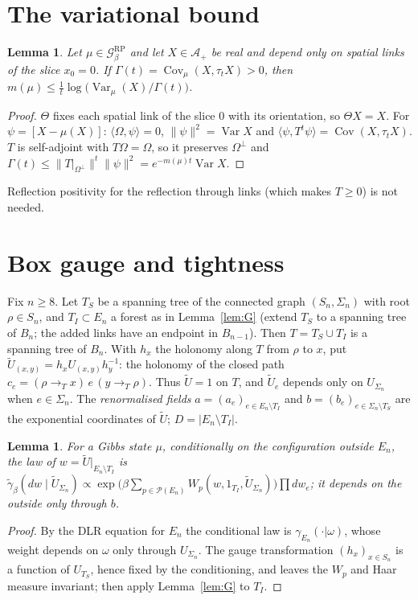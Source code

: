 \documentclass[11pt,a4paper]{article}
\theoremstyle{plain}
\newtheorem{lemma}[theorem]{Lemma}
\theoremstyle{definition}
\theoremstyle{remark}
\numberwithin{equation}{section}
\newcommand{\Var}{\operatorname{Var}}
\newcommand{\Cov}{\operatorname{Cov}}
\newcommand{\cP}{\mathcal{P}}
\newcommand{\cG}{\mathcal{G}}
\newcommand{\Th}{\Theta}
\newcommand{\Tg}{\widetilde U}
\begin{document}
\section{The variational bound}\label{sec:V}

\begin{lemma}\label{lem:V}
Let $\mu\in\cG^{\mathrm{RP}}_\beta$ and let $X\in\mathcal A_+$ be real and depend only on spatial links of the slice $x_0=0$. If
$\Gamma(t)=\Cov_\mu(X,\tau_tX)>0$, then $m(\mu)\le\frac1t\log\bigl(\Var_\mu(X)/\Gamma(t)\bigr)$.
\end{lemma}
\begin{proof}
$\Th$ fixes each spatial link of the slice $0$ with its orientation, so $\Th X=X$. For $\psi=[X-\mu(X)]$: $\langle\Omega,\psi\rangle=0$,
$\|\psi\|^2=\Var X$ and $\langle\psi,T^t\psi\rangle=\Cov(X,\tau_tX)$. $T$ is self-adjoint with $T\Omega=\Omega$, so it preserves
$\Omega^\perp$ and $\Gamma(t)\le\|T|_{\Omega^\perp}\|^t\|\psi\|^2=e^{-m(\mu)t}\Var X$.
\end{proof}
Reflection positivity for the reflection through links (which makes $T\ge0$) is not needed.

\section{Box gauge and tightness}\label{sec:box}

Fix $n\ge8$. Let $T_S$ be a spanning tree of the connected graph $(S_n,\Sigma_n)$ with root $\rho\in S_n$, and $T_I\subset E_n$ a forest as
in Lemma~\ref{lem:G} (extend $T_S$ to a spanning tree of $B_n$; the added links have an endpoint in $B_{n-1}$). Then $T=T_S\cup T_I$ is a
spanning tree of $B_n$. With $h_x$ the holonomy along $T$ from $\rho$ to $x$, put $\Tg_{(x,y)}=h_xU_{(x,y)}h_y^{-1}$: the holonomy of the
closed path $c_e=(\rho\to_Tx)\,e\,(y\to_T\rho)$. Thus $\Tg=1$ on $T$, and $\Tg_e$ depends only on $U_{\Sigma_n}$ when $e\in\Sigma_n$. The
\emph{renormalised fields} $a=(a_e)_{e\in E_n\setminus T_I}$ and $b=(b_e)_{e\in\Sigma_n\setminus T_S}$ are the exponential coordinates of
$\Tg$; $D=|E_n\setminus T_I|$.

\begin{lemma}\label{lem:cond}
For a Gibbs state $\mu$, conditionally on the configuration outside $E_n$, the law of $w=\Tg|_{E_n\setminus T_I}$ is
$\tilde\gamma_\beta(dw\mid\Tg_{\Sigma_n})\propto\exp\bigl(\beta\sum_{p\in\cP(E_n)}W_p(w,1_{T_I},\Tg_{\Sigma_n})\bigr)\prod dw_e$; it depends
on the outside only through $b$.
\end{lemma}
\begin{proof}
By the DLR equation for $E_n$ the conditional law is $\gamma_{E_n}(\cdot|\omega)$, whose weight depends on $\omega$ only through
$U_{\Sigma_n}$. The gauge transformation $(h_x)_{x\in S_n}$ is a function of $U_{T_S}$, hence fixed by the conditioning, and leaves the $W_p$
and Haar measure invariant; then apply Lemma~\ref{lem:G} to $T_I$.
\end{proof}
\end{document}
